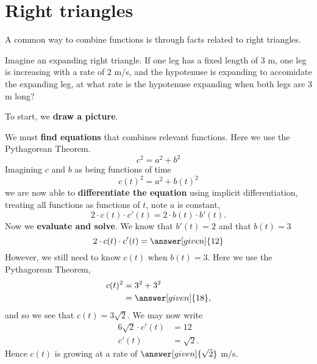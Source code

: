 \documentclass{ximera}
\begin{document}
\section{Right triangles}

A common way to combine functions is through facts related to right
triangles.


\begin{example}
  Imagine an expanding right triangle. If one leg has a fixed length
  of $3$ m, one leg is increasing with a rate of $2$ m/s, and the
  hypotenuse is expanding to accomidate the expanding leg, at what
  rate is the hypotenuse expanding when both legs are $3$ m long?
  \begin{explanation}
    To start, we \textbf{draw a picture}.
    \begin{image}
    \end{image}

    We must \textbf{find equations} that combines relevant
    functions. Here we use the Pythagorean Theorem.
    \[
    c^2 = a^2 + b^2
    \]
    Imagining $c$ and $b$ as being functions of time
    \[
    c(t)^2 = a^2 + b(t)^2
    \]
    we are now able to \textbf{differentiate the equation} using
    implicit differentiation, treating all functions as functions of
    $t$, note $a$ is constant,
    \[
    2\cdot c(t)\cdot c'(t) = 2\cdot b(t)\cdot b'(t).
    \]
    Now we \textbf{evaluate and solve}. We
    know that $b'(t) = 2$ and that $b(t) = 3$
    \[
    2\cdot c(t)\cdot c'(t) = \answer[given]{12}
    \]
    However, we still need to know $c(t)$ when $b(t) = 3$. Here we use
    the Pythagorean Theorem,
    \begin{align*}
    c(t)^2 &= 3^2 + 3^2\\
    &=\answer[given]{18},
    \end{align*}
    and so we see that $c(t) = 3\sqrt{2}$. We may now write
    \begin{align*}
      6\sqrt{2}\cdot c'(t) &= 12 \\
      c'(t) &= \sqrt{2}.
    \end{align*}
    Hence $c(t)$ is growing at a rate of $\answer[given]{\sqrt{2}}$ m/s.
  \end{explanation}
\end{example}
\end{document}
